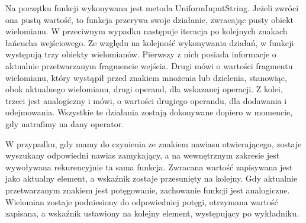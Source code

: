\documentclass[oneside,a4paper]{book}
\begin{document}
	Na początku funkcji wykonywana jest metoda UniformInputString. Jeżeli zwróci ona pustą wartość, to funkcja przerywa swoje działanie, zwracając pusty obiekt wielomianu. W przeciwnym wypadku następuje iteracja po kolejnych znakach łańcucha wejściowego. Ze względu na kolejność wykonywania działań, w funkcji występują trzy obiekty wielomianów. Pierwszy z nich posiada informacje o aktualnie przetwarzanym fragmencie wejścia. Drugi mówi o wartości fragmentu wielomianu, który wystąpił przed znakiem mnożenia lub dzielenia, stanowiąc, obok aktualnego wielomianu, drugi operand, dla wskazanej operacji. Z kolei, trzeci jest analogiczny i mówi, o wartości drugiego operandu, dla dodawania i odejmowania. Wszystkie te działania zostają dokonywane dopiero w momencie, gdy natrafimy na dany operator.
	
	W przypadku, gdy mamy do czynienia ze znakiem nawiasu otwierającego, zostaje wyszukany odpowiedni nawias zamykający, a na wewnętrznym zakresie jest wywoływana rekurencyjnie ta sama funkcja. Zwracana wartość zapisywana jest jako aktualny element, a wskaźnik zostaje przesunięty na kolejny. Gdy aktualnie przetwarzanym znakiem jest potęgowanie, zachowanie funkcji jest analogiczne. Wielomian zostaje podniesiony do odpowiedniej potęgi, otrzymana wartość zapisana, a wskaźnik ustawiony na kolejny element, występujący po wykładniku.
	
\end{document}

